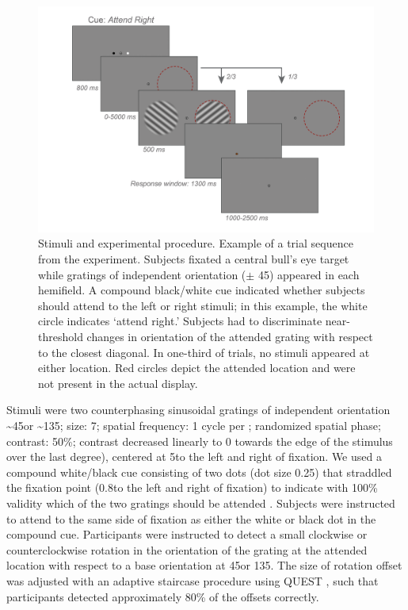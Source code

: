 \documentclass[9pt,lineno]{aperture}
\begin{document}
\begin{figure}
 \includegraphics[width=\linewidth]{img/experiment.png}
\caption{Stimuli and experimental procedure. Example of a trial sequence from the experiment. Subjects fixated a central bull's eye target while gratings of independent orientation ($\pm$ 45\textdegree) appeared in each hemifield. A compound black/white cue indicated whether subjects should attend to the left or right stimuli; in this example, the white circle indicates `attend right.' Subjects had to discriminate near-threshold changes in orientation of the attended grating with respect to the closest diagonal. In one-third of trials, no stimuli appeared at either location. Red circles depict the attended location and were not present in the actual display.}
\label{fig:experiment}
\end{figure}

Stimuli were two counterphasing sinusoidal gratings of independent orientation \textasciitilde45\textdegree or \textasciitilde135\textdegree; size: 7\textdegree; spatial frequency: 1 cycle per \textdegree; randomized spatial phase; contrast: 50\%; contrast decreased linearly to 0 towards the edge of the stimulus over the last degree), centered at 5\textdegree to the left and right of fixation. We used a compound white/black cue consisting of two dots (dot size 0.25\textdegree) that straddled the fixation point (0.8\textdegree to the left and right of fixation) to indicate with 100\% validity which of the two gratings should be attended \citep{Jehee2011}. Subjects were instructed to attend to the same side of fixation as either the white or black dot in the compound cue.
Participants were instructed to detect a small clockwise or counterclockwise rotation in the orientation of the grating at the attended location with respect to a base orientation at 45\textdegree or 135\textdegree. The size of rotation offset was adjusted with an adaptive staircase procedure using QUEST \citep{Watson1983}, such that participants detected approximately 80\% of the offsets correctly. 
\end{document}
